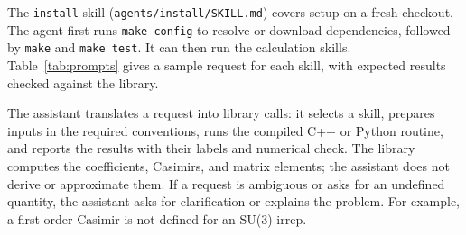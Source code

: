 \documentclass[aps,onecolumn,10pt,superscriptaddress,floatfix,nofootinbib]{revtex4}
\begin{document}
The \verb|install| skill (\verb|agents/install/SKILL.md|) covers setup on a
fresh checkout. The agent first runs \verb|make config| to resolve or download
dependencies, followed by \verb|make| and \verb|make test|. It can then run the
calculation skills. Table~\ref{tab:prompts} gives a sample request for each
skill, with expected results checked against the library.

The assistant translates a request into library calls: it selects a skill,
prepares inputs in the required conventions, runs the compiled C++ or Python
routine, and reports the results with their labels and numerical check.
The library computes the coefficients, Casimirs, and matrix elements; the
assistant does not derive or approximate them. If a request is ambiguous or
asks for an undefined quantity, the assistant asks for clarification or
explains the problem. For example, a first-order Casimir is not defined for
an SU(3) irrep.
\end{document}
